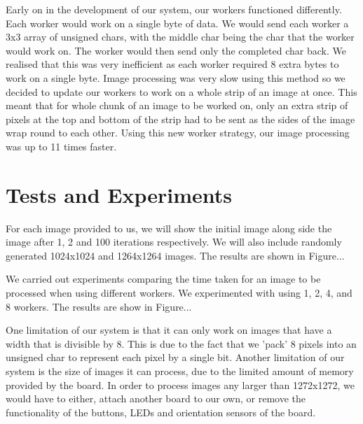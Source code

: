\documentclass{article}
\begin{document}
\begin{multicols}{2}
Early on in the development of our system, our workers functioned differently. Each worker would work
on a single byte of data. We would send each worker a 3x3 array of unsigned chars, with the middle
char being the char that the worker would work on. The worker would then send only the completed
char back. We realised that this was very inefficient as each worker required 8 extra bytes to work
on a single byte. Image processing was very slow using this method so we decided to update
our workers to work on a whole strip of an image at once. This meant that for whole chunk of an image
to be worked on, only an extra strip of pixels at the top and bottom of the strip had to be sent as
the sides of the image wrap round to each other. Using this new worker strategy, our image processing
was up to 11 times faster.

\section{Tests and Experiments}
For each image provided to us, we will show the initial image along side the image after 1, 2 and 100
iterations respectively. We will also include randomly generated 1024x1024 and 1264x1264 images. The
results are shown in Figure...

\vspace{5mm}

We carried out experiments comparing the time taken for an image to be processed when using different
workers. We experimented with using 1, 2, 4, and 8 workers. The results are show in Figure...

\vspace{5mm}

One limitation of our system is that it can only work on images that have a width that is divisible by
8. This is due to the fact that we 'pack' 8 pixels into an unsigned char to represent each pixel by
a single bit. Another limitation of our system is the size of images it can process, due to the limited
amount of memory provided by the board. In order to process images any larger than 1272x1272, we would
have to either, attach another board to our own, or remove the functionality of the buttons, LEDs and
orientation sensors of the board.

\end{multicols}

\newpage

\end{document}
